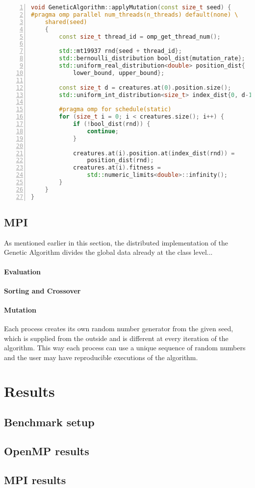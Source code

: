 \documentclass[12pt,a4paper,oneside]{article}
\begin{document}
	\begin{lstlisting}[language=C++,
		directivestyle={\color{black}},
		backgroundcolor=\color{lgrey},
    	basicstyle=\footnotesize \ttfamily \color{black} \bfseries,
		numbers=left,
		numbersep=5pt,
    	numberstyle=\tiny\color{black},
		commentstyle=\color{dkgreen},
    	rulecolor=\color{black},
    	keywordstyle=\color{purple},
    	morekeywords={size_t,std},
		tabsize=2,
    	captionpos=b,
    	caption={Parallel mutation phase in OpenMP.},
    	label={listing:omp_mutation}
	   ]
void GeneticAlgorithm::applyMutation(const size_t seed) {
#pragma omp parallel num_threads(n_threads) default(none) \
	shared(seed)
	{
		const size_t thread_id = omp_get_thread_num();

		std::mt19937 rnd{seed + thread_id};
		std::bernoulli_distribution bool_dist{mutation_rate};
		std::uniform_real_distribution<double> position_dist{
			lower_bound, upper_bound};

		const size_t d = creatures.at(0).position.size();
		std::uniform_int_distribution<size_t> index_dist{0, d-1};

		#pragma omp for schedule(static)
		for (size_t i = 0; i < creatures.size(); i++) {
			if (!bool_dist(rnd)) {
				continue;
			}

			creatures.at(i).position.at(index_dist(rnd)) =
				position_dist(rnd);
			creatures.at(i).fitness =
				std::numeric_limits<double>::infinity();
		}
	}
}
	\end{lstlisting}

	\subsection{MPI}
	As mentioned earlier in this section, the distributed implementation of the Genetic Algorithm divides the global data already at the class level...

	\paragraph{Evaluation}

	\paragraph{Sorting and Crossover}

	\paragraph{Mutation}
	Each process creates its own random number generator from the given seed, which is supplied from the outside and is different at every iteration of the algorithm.
	This way each process can use a unique sequence of random numbers and the user may have reproducible executions of the algorithm.
	
	\clearpage
	\section{Results}
	\subsection{Benchmark setup}
	\subsection{OpenMP results}
	\subsection{MPI results}
\end{document}
